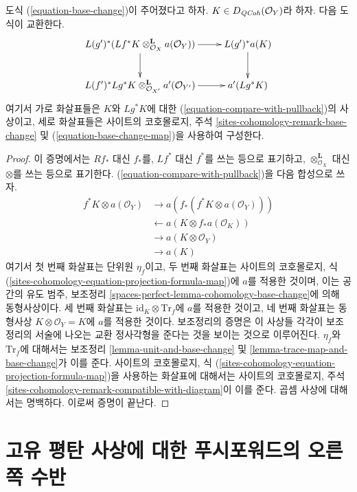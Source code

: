 \begin{lemma}
\label{lemma-restriction-compare-with-pullback}
도식 (\ref{equation-base-change})이 주어졌다고 하자.
$K \in D_{\mathit{QCoh}}(\mathcal{O}_Y)$라 하자. 다음 도식이 교환한다.
$$
\xymatrix{
L(g')^*(Lf^*K \otimes^\mathbf{L}_{\mathcal{O}_X} a(\mathcal{O}_Y))
\ar[r] \ar[d] & L(g')^*a(K) \ar[d] \\
L(f')^*Lg^*K \otimes_{\mathcal{O}_{X'}}^\mathbf{L} a'(\mathcal{O}_{Y'})
\ar[r] & a'(Lg^*K)
}
$$
여기서 가로 화살표들은 $K$와 $Lg^*K$에 대한
(\ref{equation-compare-with-pullback})의 사상이고, 세로 화살표들은
사이트의 코호몰로지, 주석
\ref{sites-cohomology-remark-base-change} 및
(\ref{equation-base-change-map})을 사용하여 구성한다.
\end{lemma}

\begin{proof}
이 증명에서는 $Rf_*$ 대신 $f_*$를, $Lf^*$ 대신 $f^*$를 쓰는 등으로
표기하고, $\otimes^\mathbf{L}_{\mathcal{O}_X}$ 대신 $\otimes$를 쓰는
등으로 표기한다. (\ref{equation-compare-with-pullback})을 다음 합성으로
쓰자.
\begin{align*}
f^*K \otimes a(\mathcal{O}_Y)
& \to
a(f_*(f^*K \otimes a(\mathcal{O}_Y))) \\
& \leftarrow
a(K \otimes f_*a(\mathcal{O}_K)) \\
& \to
a(K \otimes \mathcal{O}_Y) \\
& \to
a(K)
\end{align*}
여기서 첫 번째 화살표는 단위원 $\eta_f$이고, 두 번째 화살표는
사이트의 코호몰로지, 식
(\ref{sites-cohomology-equation-projection-formula-map})에 $a$를
적용한 것이며, 이는 공간의 유도 범주, 보조정리
\ref{spaces-perfect-lemma-cohomology-base-change}에 의해 동형사상이다.
세 번째 화살표는 $\text{id}_K \otimes \text{Tr}_f$에 $a$를 적용한
것이고, 네 번째 화살표는 동형사상
$K \otimes \mathcal{O}_Y = K$에 $a$를 적용한 것이다.
보조정리의 증명은 이 사상들 각각이 보조정리의 서술에 나오는 교환
정사각형을 준다는 것을 보이는 것으로 이루어진다. $\eta_f$와
$\text{Tr}_f$에 대해서는 보조정리
\ref{lemma-unit-and-base-change} 및
\ref{lemma-trace-map-and-base-change}가 이를 준다.
사이트의 코호몰로지, 식
(\ref{sites-cohomology-equation-projection-formula-map})을 사용하는
화살표에 대해서는 사이트의 코호몰로지, 주석
\ref{sites-cohomology-remark-compatible-with-diagram}이 이를 준다.
곱셈 사상에 대해서는 명백하다. 이로써 증명이 끝난다.
\end{proof}
\section{고유 평탄 사상에 대한 푸시포워드의 오른쪽 수반}
\label{section-proper-flat}

